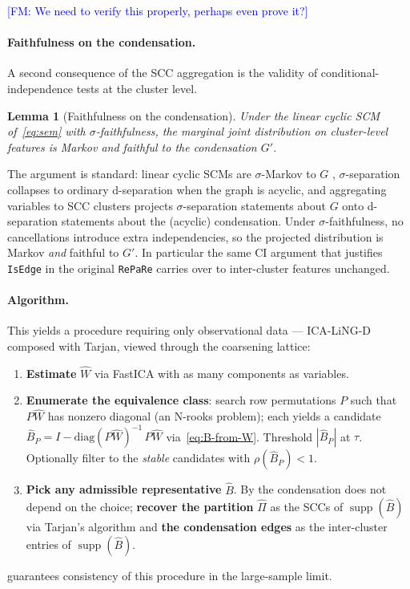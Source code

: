 \documentclass{article}
\newtheorem{lemma}{Lemma}
\newcommand{\fransays}[1]{\textcolor{blue}{[FM: #1]}}
\begin{document}
\fransays{We need to verify this properly, perhaps even prove it?} \paragraph{Faithfulness on the condensation.}
A second consequence of the SCC aggregation is the validity of conditional-independence tests at the cluster level.

\begin{lemma}[Faithfulness on the condensation]\label{lem:cond-faith}
    Under the linear cyclic SCM of~\eqref{eq:sem} with $\sigma$-faithfulness, the marginal joint distribution on cluster-level features is Markov and faithful to the condensation $G'$.
\end{lemma}

\noindent
The argument is standard: linear cyclic SCMs are $\sigma$-Markov to $G$ \citep{spirtes1995directed,bongers2021foundations}, $\sigma$-separation collapses to ordinary d-separation when the graph is acyclic, and aggregating variables to SCC clusters projects $\sigma$-separation statements about $G$ onto d-separation statements about the (acyclic) condensation. Under $\sigma$-faithfulness, no cancellations introduce extra independencies, so the projected distribution is Markov \emph{and} faithful to $G'$. In particular the same CI argument that justifies \texttt{IsEdge} in the original \texttt{RePaRe} carries over to inter-cluster features unchanged.

\paragraph{Algorithm.} This yields a procedure requiring only observational data --- ICA-LiNG-D \citep{lacerda2008discovering} composed with Tarjan, viewed through the coarsening lattice:
\begin{enumerate}
    \item \textbf{Estimate} $\hat W$ via FastICA \citep{hyvarinen1999fast} with as many components as variables.
    \item \textbf{Enumerate the equivalence class}: search row permutations $P$ such that $P\hat W$ has nonzero diagonal (an N-rooks problem); each yields a candidate $\hat B_P = I - \mathrm{diag}(P\hat W)^{-1}\,P\hat W$ via~\eqref{eq:B-from-W}. Threshold $|\hat B_P|$ at $\tau$. Optionally filter to the \emph{stable} candidates with $\rho(\hat B_P) < 1$.
    \item \textbf{Pick any admissible representative} $\hat B$. By  the condensation does not depend on the choice; \textbf{recover the partition} $\hat\Pi$ as the SCCs of $\operatorname{supp}(\hat B)$ via Tarjan's algorithm \citep{tarjan1972depth} and \textbf{the condensation edges} as the inter-cluster entries of $\operatorname{supp}(\hat B)$.
\end{enumerate}
 guarantees consistency of this procedure in the large-sample limit.
\end{document}
